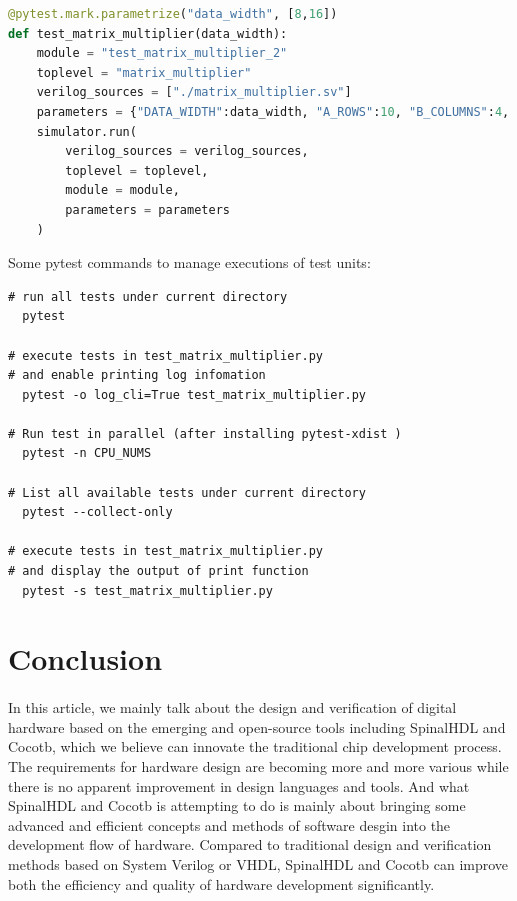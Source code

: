 \documentclass{article}
\begin{document}
\begin{lstlisting}[language=python]
@pytest.mark.parametrize("data_width", [8,16])
def test_matrix_multiplier(data_width):
    module = "test_matrix_multiplier_2"
    toplevel = "matrix_multiplier"
    verilog_sources = ["./matrix_multiplier.sv"]
    parameters = {"DATA_WIDTH":data_width, "A_ROWS":10, "B_COLUMNS":4, "A_COLUMNS_B_ROWS":6}
    simulator.run(
        verilog_sources = verilog_sources,
        toplevel = toplevel,
        module = module,
        parameters = parameters
    )
\end{lstlisting}

Some pytest commands to manage executions of test units:
\begin{lstlisting}
# run all tests under current directory
  pytest

# execute tests in test_matrix_multiplier.py
# and enable printing log infomation
  pytest -o log_cli=True test_matrix_multiplier.py

# Run test in parallel (after installing pytest-xdist )
  pytest -n CPU_NUMS

# List all available tests under current directory
  pytest --collect-only

# execute tests in test_matrix_multiplier.py
# and display the output of print function
  pytest -s test_matrix_multiplier.py
\end{lstlisting}

\section{Conclusion}
\paragraph{}
In this article, we mainly talk about the design and verification of digital hardware based on the emerging and open-source tools including SpinalHDL and Cocotb, which we believe can innovate the traditional chip development process. The requirements for hardware design are becoming more and more various while there is no apparent improvement in design languages and tools. And what SpinalHDL and Cocotb is attempting to do is mainly about bringing some advanced and efficient concepts and methods of software desgin into the development flow of hardware. Compared to traditional design and verification methods based on System Verilog or VHDL, SpinalHDL and Cocotb can improve both the efficiency and quality of hardware development significantly.
\end{document}
